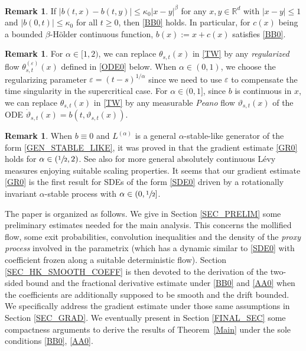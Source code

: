 \documentclass[JEP,XML,SOM,Unicode,published]{cedram}
\theoremstyle{plain}
\theoremstyle{definition}
\newtheorem{remark}[theorem]{Remark}
\let\eps\varepsilon
\newcommand\mR{\mathbb{R}}
\newcommand\1{{\mathbf{1}}}
\begin{document}
\begin{remark}
If $|b(t,x)-b(t,y)|\leq\kappa_0|x-y|^\beta$ for any $x,y\in\mR^d$ with $|x-y|\leq 1$ and $|b(0,t)|\le \kappa_0 $ for all $t\ge 0 $, then
\eqref{BB0} holds. In particular, for $c(x)$ being a bounded $\beta$-Hölder continuous function, $b(x):=x+c(x)$ satisfies \eqref{BB0}.
\end{remark}

\begin{remark}
For $\alpha\in[1,2)$, we can replace $\theta_{s,t}(x)$ in \eqref{TW} by any {\it regularized} flow $\theta^{(\eps)}_{s,t}(x)$
defined in \eqref{ODE0} below. When $\alpha\in(0,1)$, we choose the regularizing parameter $\eps=(t-s)^{1/\alpha}$ since we need to use $\eps$ to compensate the
time singularity in the supercritical case.
For $\alpha\in(0,1]$, since $b$ is continuous in $x$, we can replace $\theta_{s,t}(x)$ in \eqref{TW} by any measurable {\it Peano} flow $\vartheta_{s,t}(x)$ of the ODE
$\dot\vartheta_{s,t}(x)=b(t,\vartheta_{s,t}(x))$.
\end{remark}

\begin{remark}
When $b\equiv 0$ and $L^{(\alpha)}$ is a general $\alpha$-stable-like {generator of the form \eqref{GEN_STABLE_LIKE}}, it was proved in \cite{Li-So-Xi}
that the gradient estimate \eqref{GR0} holds for $\alpha\in(\sfrac12,2)$. See also \cite{Ch-Zh20} for more general
{absolutely continuous Lévy measures enjoying suitable scaling properties.
}
It seems that our gradient estimate \eqref{GR0} is the first result for SDEs of the form \eqref{SDE0} driven by a rotationally invariant $\alpha$-stable process
with $\alpha\in(0,\sfrac12]$.
\end{remark}

The paper is organized as follows. We give in Section \ref{SEC_PRELIM} some preliminary estimates needed for the main analysis. This concerns the mollified flow, some exit probabilities, convolution inequalities and the density of the \textit{proxy process} involved in the parametrix (which has a dynamic similar to \eqref{SDE0} with coefficient frozen along a suitable deterministic flow).
Section \ref{SEC_HK_SMOOTH_COEFF} is then {devoted} to the derivation of the two-sided bound and the fractional derivative estimate under \eqref{BB0} and \eqref{AA0} when the coefficients are additionally supposed to be smooth and the drift bounded. We specifically address the gradient estimate under those same assumptions in Section \ref{SEC_GRAD}. We eventually present in Section \ref{FINAL_SEC} some compactness arguments to derive the results of Theorem~\ref{Main} under the sole conditions \eqref{BB0}, \eqref{AA0}.
\end{document}
